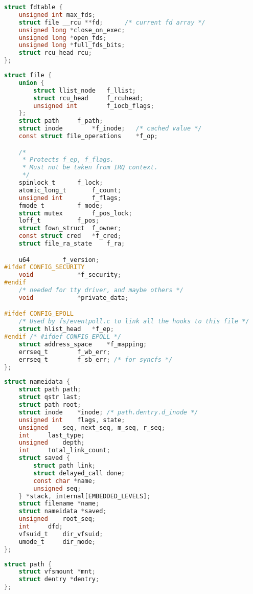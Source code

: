 \begin{lstlisting}[language=c, caption={struct fdtable}]
struct fdtable {
	unsigned int max_fds;
	struct file __rcu **fd;      /* current fd array */
	unsigned long *close_on_exec;
	unsigned long *open_fds;
	unsigned long *full_fds_bits;
	struct rcu_head rcu;
};
\end{lstlisting}

\pagebreak

\begin{lstlisting}[language=c, caption={struct file}]
struct file {
	union {
		struct llist_node	f_llist;
		struct rcu_head 	f_rcuhead;
		unsigned int 		f_iocb_flags;
	};
	struct path		f_path;
	struct inode		*f_inode;	/* cached value */
	const struct file_operations	*f_op;

	/*
	 * Protects f_ep, f_flags.
	 * Must not be taken from IRQ context.
	 */
	spinlock_t		f_lock;
	atomic_long_t		f_count;
	unsigned int 		f_flags;
	fmode_t			f_mode;
	struct mutex		f_pos_lock;
	loff_t			f_pos;
	struct fown_struct	f_owner;
	const struct cred	*f_cred;
	struct file_ra_state	f_ra;

	u64			f_version;
#ifdef CONFIG_SECURITY
	void			*f_security;
#endif
	/* needed for tty driver, and maybe others */
	void			*private_data;

#ifdef CONFIG_EPOLL
	/* Used by fs/eventpoll.c to link all the hooks to this file */
	struct hlist_head	*f_ep;
#endif /* #ifdef CONFIG_EPOLL */
	struct address_space	*f_mapping;
	errseq_t		f_wb_err;
	errseq_t		f_sb_err; /* for syncfs */
};
\end{lstlisting}

\begin{lstlisting}[language=c, caption={struct nameidata}]
struct nameidata {
	struct path	path;
	struct qstr	last;
	struct path	root;
	struct inode	*inode; /* path.dentry.d_inode */
	unsigned int	flags, state;
	unsigned	seq, next_seq, m_seq, r_seq;
	int		last_type;
	unsigned	depth;
	int		total_link_count;
	struct saved {
		struct path link;
		struct delayed_call done;
		const char *name;
		unsigned seq;
	} *stack, internal[EMBEDDED_LEVELS];
	struct filename	*name;
	struct nameidata *saved;
	unsigned	root_seq;
	int		dfd;
	vfsuid_t	dir_vfsuid;
	umode_t		dir_mode;
};
\end{lstlisting}

\begin{lstlisting}[language=c, caption={struct path}]
struct path {
	struct vfsmount *mnt;
	struct dentry *dentry;
};
\end{lstlisting}

